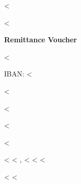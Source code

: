 <%

\begin{CJK}{UTF8}{arialuni}

\vspace*{-3.3cm}
<%
\vspace*{1.5cm}

\centerline{\textbf{Remittance Voucher}}

\hfill <%

IBAN: <%

<%

\vspace{0.3cm}

<%

<%

<%

<%
<%
\hspace{-1mm}, <%
<%
<%

<%
\vfill
<%
\end{CJK}
